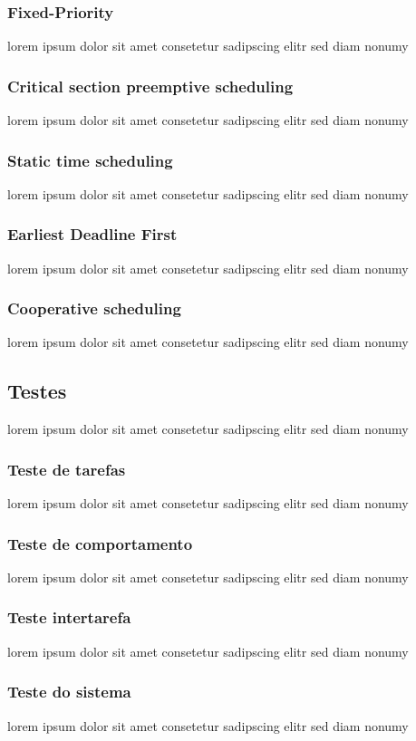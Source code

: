 \subsubsection{Fixed-Priority}
lorem ipsum dolor sit amet consetetur sadipscing elitr sed diam nonumy

\subsubsection{Critical section preemptive scheduling}
lorem ipsum dolor sit amet consetetur sadipscing elitr sed diam nonumy

\subsubsection{Static time scheduling}
lorem ipsum dolor sit amet consetetur sadipscing elitr sed diam nonumy

\subsubsection{Earliest Deadline First}
lorem ipsum dolor sit amet consetetur sadipscing elitr sed diam nonumy

\subsubsection{Cooperative scheduling}
lorem ipsum dolor sit amet consetetur sadipscing elitr sed diam nonumy


\subsection{Testes}
lorem ipsum dolor sit amet consetetur sadipscing elitr sed diam nonumy

\subsubsection{Teste de tarefas}
lorem ipsum dolor sit amet consetetur sadipscing elitr sed diam nonumy

\subsubsection{Teste de comportamento}
lorem ipsum dolor sit amet consetetur sadipscing elitr sed diam nonumy

\subsubsection{Teste intertarefa}
lorem ipsum dolor sit amet consetetur sadipscing elitr sed diam nonumy

\subsubsection{Teste do sistema}
lorem ipsum dolor sit amet consetetur sadipscing elitr sed diam nonumy
